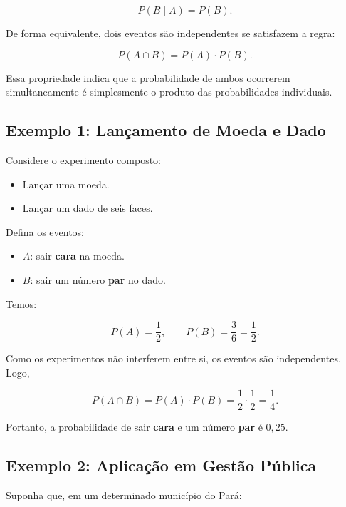 \begin{equation}
P(B\mid A)=P(B).
\end{equation}

De forma equivalente, dois eventos são independentes se satisfazem a regra:

\begin{equation}
P(A\cap B)=P(A)\cdot P(B).
\end{equation}

Essa propriedade indica que a probabilidade de ambos ocorrerem simultaneamente
é simplesmente o produto das probabilidades individuais.



\subsection*{Exemplo 1: Lançamento de Moeda e Dado}

Considere o experimento composto:

\begin{itemize}
\item Lançar uma moeda.
\item Lançar um dado de seis faces.
\end{itemize}

Defina os eventos:

\begin{itemize}
\item $A$: sair \textbf{cara} na moeda.
\item $B$: sair um número \textbf{par} no dado.
\end{itemize}

Temos:

\[
P(A)=\frac{1}{2},
\qquad
P(B)=\frac{3}{6}=\frac{1}{2}.
\]

Como os experimentos não interferem entre si, os eventos são independentes.
Logo,

\begin{equation}
P(A\cap B)=P(A)\cdot P(B)
=\frac{1}{2}\cdot\frac{1}{2}
=\frac{1}{4}.
\end{equation}

Portanto, a probabilidade de sair \textbf{cara} e um número \textbf{par} é $0,25$.


\subsection*{Exemplo 2: Aplicação em Gestão Pública}

Suponha que, em um determinado município do Pará:

